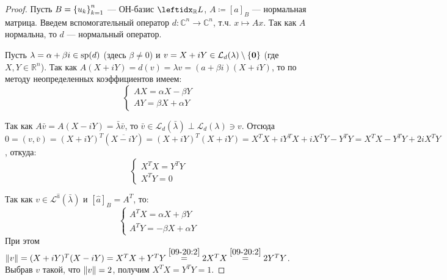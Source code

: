 \begin{proof}
    Пусть $B = \left\{u_k\right\}_{k=1}^{n}$ --- ОН-базис $\lsub{\mathbb{R}}{L}$, $A \coloneqq [a]_B$ --- нормальная матрица. Введем вспомогательный оператор $d \colon \mathbb{C}^n \to \mathbb{C}^n$, т.ч. $x \mapsto Ax$. Так как $A$ нормальна, то $d$ --- нормальный оператор.
    \smallskip
    
    Пусть $\lambda = \alpha + \beta i \in \operatorname{sp}(d)$ (здесь $\beta \neq 0$) и $v = X + iY \in \mathcal{L}_d(\lambda) \setminus \{\mathbf{0}\}$ (где $X, Y \in \mathbb{R}^n$). Так как $A(X + iY) = d(v) = \lambda v = (a + \beta i)(X + iY)$, то по методу неопределенных коэффициентов имеем:
    \begin{equation}\label{09-20:1}
        \begin{cases}
            AX = \alpha X - \beta Y \\
            AY = \beta X + \alpha Y
        \end{cases}
    \end{equation}
    
    Так как $A \bar{v} = A(X - iY) = \bar{\lambda} \bar{v}$, то $\bar{v} \in \mathcal{L}_d(\bar{\lambda}) \perp \mathcal{L}_d(\lambda) \ni v$. Отсюда $0 = (v, \bar{v}) = (X + iY)^T(\overline{X - iY}) = (X + iY)^T (X +iY) = X^T X + iY^T X + iX^T Y - Y^T Y = X^T X - Y^T Y + 2i X^T Y$, откуда:
    \begin{equation}\label{09-20:2}
        \begin{cases}
            X^T X = Y^T Y \\
            X^T Y = 0
        \end{cases}
    \end{equation}
    
    Так как $v \in \mathcal{L}^{\hat{a}}(\bar{\lambda})$ и $[\hat{a}]_B = A^T$, то:
    \begin{equation}\label{09-20:3}
        \begin{cases}
            A^T X = \alpha X + \beta Y \\
            A^T Y = -\beta X + \alpha Y
        \end{cases}
    \end{equation}
    При этом $\left\lVert v\right\rVert = (X + iY)^T (X - iY) = X^T X + Y^T Y \stackrel{\eqref{09-20:2}}{=} 2 X^T X \stackrel{\eqref{09-20:2}}{=} 2 Y^T Y$. Выбрав $v$ такой, что $\left\lVert v\right\rVert = 2$, получим $X^T X = Y^T Y = 1$.
    \smallskip
    

\end{proof}
